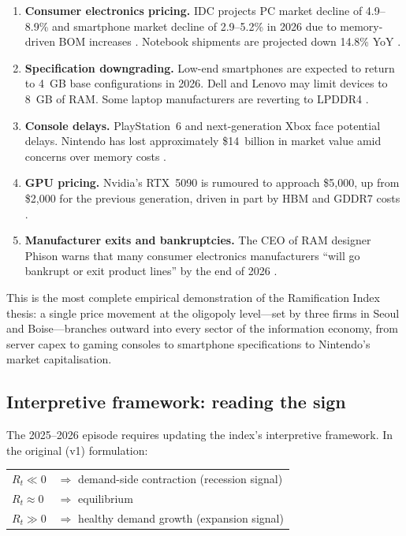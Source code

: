 \documentclass[12pt]{article}
\theoremstyle{definition}
\begin{document}
\begin{enumerate}[itemsep=4pt]
\item \textbf{Consumer electronics pricing.} IDC projects PC market decline of 4.9--8.9\% and smartphone market decline of 2.9--5.2\% in 2026 due to memory-driven BOM increases \cite{ColdFusion2026}. Notebook shipments are projected down 14.8\% YoY \cite{TrendForce2026Q2}.

\item \textbf{Specification downgrading.} Low-end smartphones are expected to return to 4~GB base configurations in 2026. Dell and Lenovo may limit devices to 8~GB of RAM. Some laptop manufacturers are reverting to LPDDR4 \cite{TrendForce2025Dec_consumer}.

\item \textbf{Console delays.} PlayStation~6 and next-generation Xbox face potential delays. Nintendo has lost approximately \$14~billion in market value amid concerns over memory costs \cite{ColdFusion2026}.

\item \textbf{GPU pricing.} Nvidia's RTX~5090 is rumoured to approach \$5,000, up from \$2,000 for the previous generation, driven in part by HBM and GDDR7 costs \cite{ColdFusion2026}.

\item \textbf{Manufacturer exits and bankruptcies.} The CEO of RAM designer Phison warns that many consumer electronics manufacturers ``will go bankrupt or exit product lines'' by the end of 2026 \cite{ColdFusion2026}.
\end{enumerate}

This is the most complete empirical demonstration of the Ramification Index thesis: a single price movement at the oligopoly level---set by three firms in Seoul and Boise---branches outward into every sector of the information economy, from server capex to gaming consoles to smartphone specifications to Nintendo's market capitalisation.

\subsection{Interpretive framework: reading the sign}

The 2025--2026 episode requires updating the index's interpretive framework. In the original (v1) formulation:

\begin{center}
\begin{tabular}{ll}
$R_t \ll 0$ & $\Rightarrow$ demand-side contraction (recession signal) \\
$R_t \approx 0$ & $\Rightarrow$ equilibrium \\
$R_t \gg 0$ & $\Rightarrow$ healthy demand growth (expansion signal)
\end{tabular}
\end{center}
\end{document}
